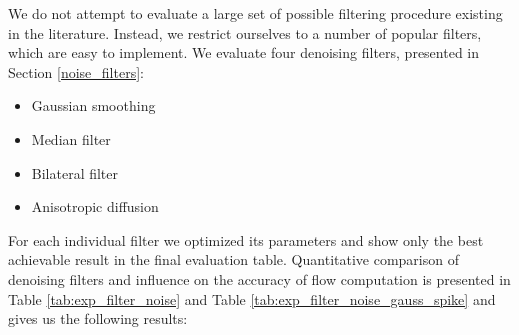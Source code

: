 We do not attempt to evaluate a large set of possible filtering procedure existing in the literature. Instead, we restrict ourselves to a number of popular filters, which are easy to implement. We evaluate four denoising filters, presented in Section \ref{noise_filters}: 
\begin{itemize}
\item Gaussian smoothing
\item Median filter
\item Bilateral filter
\item Anisotropic diffusion
\end{itemize}
For each individual filter we optimized its parameters and show only the best achievable result in the final evaluation table. Quantitative comparison of denoising filters and influence on the accuracy of flow computation is presented in Table \ref{tab:exp_filter_noise} and Table \ref{tab:exp_filter_noise_gauss_spike} and gives us the following results:   

